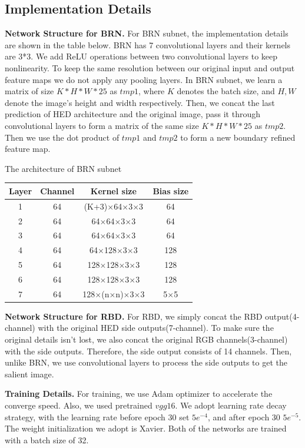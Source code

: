 \documentclass[10pt,journal, compsoc]{IEEEtran}
\begin{document}
\subsection{Implementation Details}
\noindent\textbf{Network Structure for BRN.} 
For BRN subnet, the implementation details are shown in the table below. BRN has 7 convolutional layers and their kernels are 3*3. We add ReLU operations between two convolutional layers to keep nonlinearity. To keep the same resolution between our original input and output feature maps we do not apply any pooling layers. 
In BRN subnet, we learn a matrix of size $K*H*W*25$ as $tmp1$, where $K$ denotes the batch size, and $H,W$ denote the image's height and width respectively.  Then, we concat the last prediction of HED architecture and the original image, pass it through  convolutional layers to form a matrix of the same size $K*H*W*25$ as $tmp2$. Then we use the dot product of $tmp1$ and $tmp2$ to form a new boundary refined feature map. 
\begin{table}[!htbp]
	\centering
	\tablename{ The architecture of BRN subnet}
	\begin{tabular}[I]{cccc}
		\hline
	    Layer & Channel& Kernel size&Bias size\\
		\hline
		1& 64& (K+3)$\times$64$\times$3$\times$3 & 64 \\
		2& 64& 64$\times$64$\times$3$\times$3 & 64 \\
		3& 64& 64$\times$64$\times$3$\times$3 & 64 \\
		4& 64& 64$\times$128$\times$3$\times$3 & 128 \\
		5& 64& 128$\times$128$\times$3$\times$3 & 128 \\
		6& 64& 128$\times$128$\times$3$\times$3 & 128 \\
		7& 64& 128$\times$(n$\times$n)$\times$3$\times$3 & 5$\times$5 \\
		\hline
	\end{tabular}
\end{table} 

\noindent\textbf{Network Structure for RBD.} 
For RBD, we simply concat the RBD output(4-channel) with the original HED side outputs(7-channel). To make sure the original details isn't lost, we also concat the original RGB channels(3-channel) with the side outputs. Therefore, the side output consists of 14 channels. Then, unlike BRN, we use convolutional layers to process the side outputs to get the salient image.

\noindent\textbf{Training Details.}
For training, we use Adam optimizer to accelerate the converge speed. Also, we used pretrained $vgg16$. We adopt learning rate decay strategy,  with the learning rate before epoch $30$ set $5e^{-4}$, and after epoch $30$ $5e^{-5}$. The weight initialization we adopt is Xavier. Both of the networks are trained with a batch size of 32. 
\end{document}
